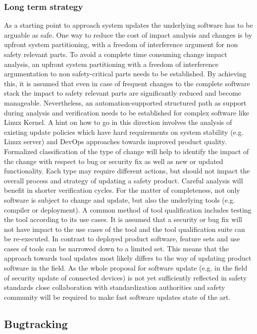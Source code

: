 \documentclass[12pt]{ElisaPaper}
\begin{document}
\subsubsection{Long term strategy}
As a starting point to approach system updates the underlying software has to be arguable as safe.  
One way to reduce the cost of impact analysis and changes is by upfront system partitioning, with a freedom of interference argument for non safety relevant parts.
To avoid a complete time consuming change impact analysis, an upfront system partitioning with a  freedom of interference argumentation to non safety-critical parts needs to be established.
By achieving this, it is assumed that even in case of frequent changes to the complete software stack the impact to safety relevant parts are significantly reduced and become manageable. 
Nevertheless, an automation-supported structured path as support during analysis and verification needs to be established for complex software like Linux Kernel. 
A hint on how to go in this direction involves the analysis of existing update policies which have hard requirements on system stability (e.g. Linux server) and DevOps approaches towards improved product quality. 
Formalized classification of the type of change will help to identify the impact of the change with respect to bug or security fix as well as new or updated functionality. 
Each type may require different actions, but should not impact the overall process and strategy of updating a safety product. 
Careful analysis will benefit in shorter verification cycles. 
For the matter of completeness, not only software is subject to change and update, but also the underlying tools (e.g. compiler or deployment). 
A common method of tool qualification includes testing the tool according to its use cases. 
It is assumed that a security or bug fix will not have impact to the use cases of the tool and the tool qualification suite can be re-executed. 
In contrast to deployed product software, feature sets and use cases of tools can be narrowed down to a limited set. 
This means that the approach towards tool updates most likely differs to the way of updating product software in the field.
As the whole proposal for software update (e.g. in the field of security update of connected devices)  is not yet sufficiently reflected in safety standards close collaboration with standardization authorities and safety community will be required to make fast software updates state of the art.

\subsection{Bugtracking}
\end{document}
